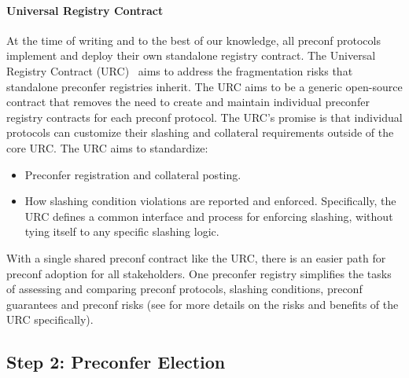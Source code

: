 \documentclass[a4paper]{article}
\theoremstyle{boldstyle}
\begin{document}
        \paragraph{Universal Registry Contract}
        At the time of writing and to the best of our knowledge, all preconf protocols implement and deploy their own standalone registry contract. The Universal Registry Contract  (URC)~\cite{W:UniversalRegistryContract,W:GitHub-UniversalRegistryContract} aims to address the fragmentation risks that standalone preconfer registries inherit. The URC aims to be a generic open-source contract that removes the need to create and maintain individual preconfer registry contracts for each preconf protocol. The URC's promise is that individual protocols can customize their slashing and collateral requirements outside of the core URC. The URC aims to standardize:
        \begin{itemize}
            \item Preconfer registration and collateral posting.
            \item How slashing condition violations are reported and enforced. Specifically, the URC defines a common interface and process for enforcing slashing, without tying itself to any specific slashing logic.
        \end{itemize}

        With a single shared preconf contract like the URC, there is an easier path for preconf adoption for all stakeholders. One preconfer registry simplifies the tasks of assessing and comparing preconf protocols, slashing conditions, preconf guarantees and preconf risks (see \cite{W:UnifiedPreconfRegistry} for more details on the risks and benefits of the URC specifically). %


      
\subsection{Step 2: Preconfer Election} 
\label{preconf_election}
\end{document}
